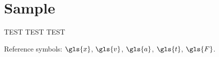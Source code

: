 \chapter{Sample}

TEST TEST TEST

Reference symbols: $\gls{x}$, $\gls{v}$, $\gls{a}$, $\gls{t}$,
$\gls{F}$.